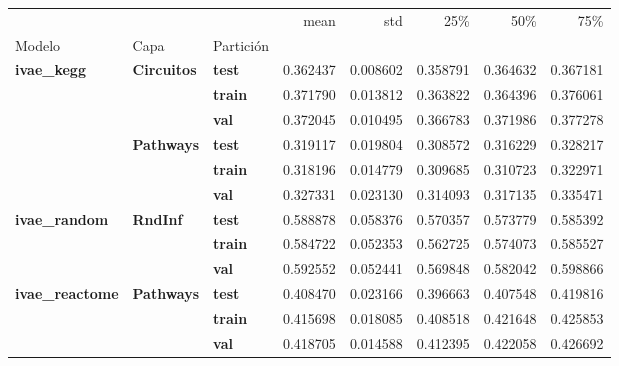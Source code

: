 \begin{tabular}{lllrrrrr}
\toprule
 &  &  & mean & std & 25\% & 50\% & 75\% \\
Modelo & Capa & Partición &  &  &  &  &  \\
\midrule
\multirow[t]{6}{*}{\textbf{ivae\_kegg}} & \multirow[t]{3}{*}{\textbf{Circuitos}} & \textbf{test} & 0.362437 & 0.008602 & 0.358791 & 0.364632 & 0.367181 \\
\textbf{} & \textbf{} & \textbf{train} & 0.371790 & 0.013812 & 0.363822 & 0.364396 & 0.376061 \\
\textbf{} & \textbf{} & \textbf{val} & 0.372045 & 0.010495 & 0.366783 & 0.371986 & 0.377278 \\
\cline{2-8}
\textbf{} & \multirow[t]{3}{*}{\textbf{Pathways}} & \textbf{test} & 0.319117 & 0.019804 & 0.308572 & 0.316229 & 0.328217 \\
\textbf{} & \textbf{} & \textbf{train} & 0.318196 & 0.014779 & 0.309685 & 0.310723 & 0.322971 \\
\textbf{} & \textbf{} & \textbf{val} & 0.327331 & 0.023130 & 0.314093 & 0.317135 & 0.335471 \\
\cline{1-8} \cline{2-8}
\multirow[t]{3}{*}{\textbf{ivae\_random}} & \multirow[t]{3}{*}{\textbf{RndInf}} & \textbf{test} & 0.588878 & 0.058376 & 0.570357 & 0.573779 & 0.585392 \\
\textbf{} & \textbf{} & \textbf{train} & 0.584722 & 0.052353 & 0.562725 & 0.574073 & 0.585527 \\
\textbf{} & \textbf{} & \textbf{val} & 0.592552 & 0.052441 & 0.569848 & 0.582042 & 0.598866 \\
\cline{1-8} \cline{2-8}
\multirow[t]{3}{*}{\textbf{ivae\_reactome}} & \multirow[t]{3}{*}{\textbf{Pathways}} & \textbf{test} & 0.408470 & 0.023166 & 0.396663 & 0.407548 & 0.419816 \\
\textbf{} & \textbf{} & \textbf{train} & 0.415698 & 0.018085 & 0.408518 & 0.421648 & 0.425853 \\
\textbf{} & \textbf{} & \textbf{val} & 0.418705 & 0.014588 & 0.412395 & 0.422058 & 0.426692 \\
\cline{1-8} \cline{2-8}
\bottomrule
\end{tabular}
